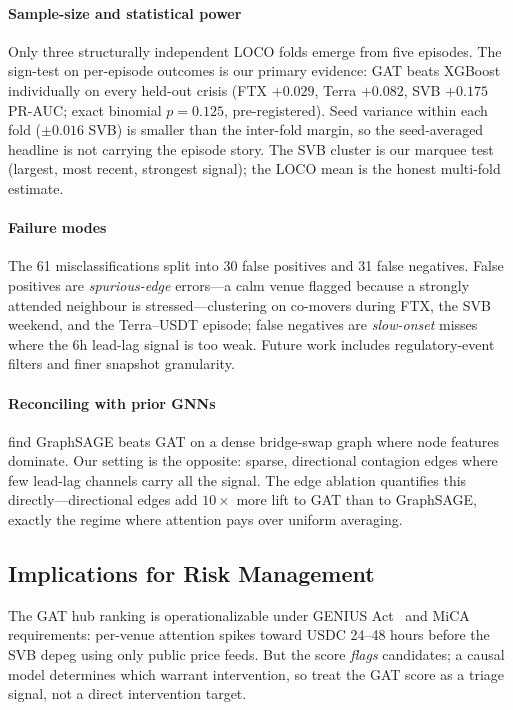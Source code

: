 \documentclass[sigconf,anonymous]{acmart}
\begin{document}
\paragraph{Sample-size and statistical power}
Only three structurally independent LOCO folds emerge from five episodes. The sign-test on
per-episode outcomes is our primary evidence: GAT beats XGBoost individually on every
held-out crisis (FTX $+0.029$, Terra $+0.082$, SVB $+0.175$ PR-AUC; exact binomial
$p=0.125$, pre-registered). Seed variance within each fold ($\pm0.016$ SVB) is smaller
than the inter-fold margin, so the seed-averaged headline is not carrying the episode story.
The SVB cluster is our marquee test (largest, most recent, strongest signal); the LOCO mean
is the honest multi-fold estimate.

\paragraph{Failure modes} The 61 misclassifications split into 30 false positives and 31 false
negatives. False positives are \emph{spurious-edge} errors---a calm venue flagged because a
strongly attended neighbour is stressed---clustering on co-movers during FTX, the SVB weekend,
and the Terra--USDT episode; false negatives are \emph{slow-onset} misses where the 6h lead-lag
signal is too weak. Future work includes regulatory-event filters and finer snapshot granularity.

\paragraph{Reconciling with prior GNNs} \citet{zhou2025bridge} find GraphSAGE beats GAT on a dense bridge-swap graph where node features dominate. Our setting is the opposite: sparse, directional contagion edges where few lead-lag channels carry all the signal. The edge ablation quantifies this directly---directional edges add $10{\times}$ more lift to GAT than to GraphSAGE, exactly the regime where attention pays over uniform averaging.

\subsection{Implications for Risk Management}
The GAT hub ranking is operationalizable under GENIUS Act~\cite{genius2025} and
MiCA~\cite{mica2023} requirements: per-venue attention spikes toward USDC 24--48 hours
before the SVB depeg using only public price feeds. But the score \emph{flags} candidates; a causal
model determines which warrant intervention, so
treat the GAT score as a triage signal, not a direct intervention target.
\end{document}
